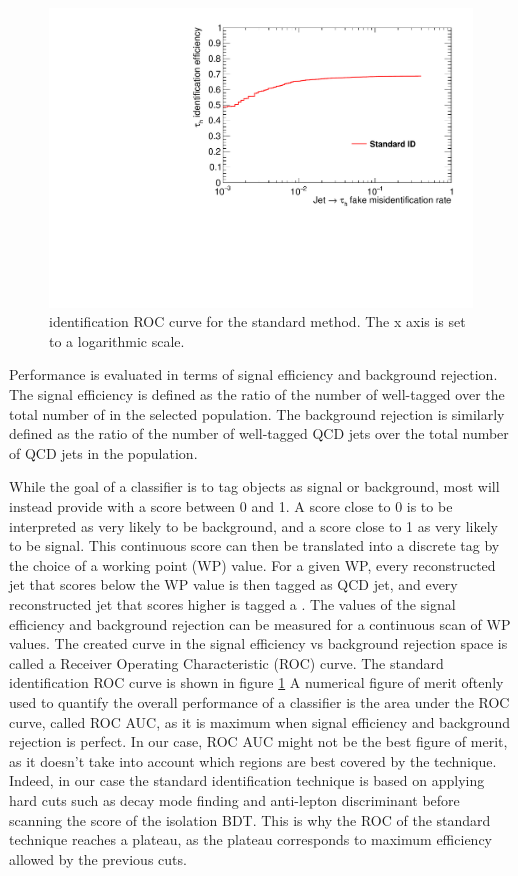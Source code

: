 \begin{figure}
    \centering
    \includegraphics[width=\textwidth]{Images/ROC_comp_std.pdf}
    \caption{\tauh identification ROC curve for the standard method. The x axis is set to a logarithmic scale.}
    \label{fig:std_ROC}
\end{figure}

Performance is evaluated in terms of signal efficiency and background rejection. The signal efficiency is defined as the ratio of the number of well-tagged \tauh over the total number of \tauh in the selected population. The background rejection is similarly defined as the ratio of the number of well-tagged QCD jets over the total number of QCD jets in the population.

While the goal of a classifier is to tag objects as signal or background, most will instead provide with a score between 0 and 1. A score close to 0 is to be interpreted as very likely to be background, and a score close to 1 as very likely to be signal. This continuous score can then be translated into a discrete tag by the choice of a working point (WP) value. For a given WP, every reconstructed jet that scores below the WP value is then tagged as QCD jet, and every reconstructed jet that scores higher is tagged a \tauh. The values of the signal efficiency and background rejection can be measured for a continuous scan of WP values. The created curve in the signal efficiency vs background rejection space is called a Receiver Operating Characteristic (ROC) curve. The standard identification ROC curve is shown in figure \ref{fig:std_ROC}
A numerical figure of merit oftenly used to quantify the overall performance of a classifier is the area under the ROC curve, called ROC AUC, as it is maximum when signal efficiency and background rejection is perfect.
In our case, ROC AUC might not be the best figure of merit, as it doesn't take into account which regions are best covered by the technique. Indeed, in our case the standard identification technique is based on applying hard cuts such as decay mode finding and anti-lepton discriminant before scanning the score of the isolation BDT. This is why the ROC of the standard technique reaches a plateau, as the plateau corresponds to maximum efficiency allowed by the previous cuts.

